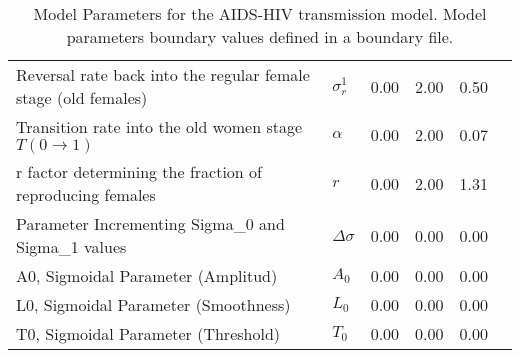 \begin{table}
\begin{tabular}{p{5cm}lcccc}
Reversal rate back into the regular female stage (old females) & $\sigma^1_r$ & 0.00 & 2.00 & 0.50\\
Transition rate into the old women stage $T(0\rightarrow 1)$ & $\alpha$ & 0.00 & 2.00 & 0.07\\
r factor determining the fraction of reproducing females & $r$ & 0.00 & 2.00 & 1.31\\
Parameter Incrementing Sigma_0 and Sigma_1 values  & $\Delta\sigma$ & 0.00 & 0.00 & 0.00\\
A0, Sigmoidal Parameter (Amplitud) & $A_0$ & 0.00 & 0.00 & 0.00\\
L0, Sigmoidal Parameter (Smoothness) & $L_0$ & 0.00 & 0.00 & 0.00\\
T0, Sigmoidal Parameter (Threshold) & $T_0$ & 0.00 & 0.00 & 0.00\\
\hline\hline
\end{tabular}
\caption{Model Parameters for the AIDS-HIV transmission model. Model parameters boundary values defined in a boundary file.}
\end{table}
